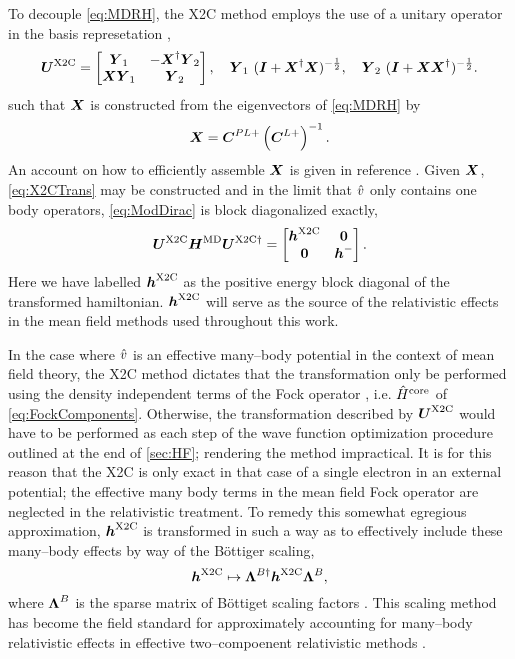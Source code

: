 To decouple \cref{eq:MDRH},
the X2C method employs the use of a unitary operator in the basis represetation ,
\begin{equation}
\label{eq:X2CTrans}
\boldsymbol{U}^{\mathrm{X2C}} = \begin{bmatrix} \boldsymbol{Y}_1 & - \boldsymbol{X}^\dagger \boldsymbol{Y}_2 \\ \boldsymbol{X} \boldsymbol{Y}_1 & \boldsymbol{Y}_2 \end{bmatrix},
\quad \boldsymbol{Y}_1 \ (\boldsymbol{I} + \boldsymbol{X}^\dagger \boldsymbol{X})^{-\frac{1}{2}},  
\quad \boldsymbol{Y}_2 \ (\boldsymbol{I} + \boldsymbol{X} \boldsymbol{X}^\dagger)^{-\frac{1}{2}}.  
\end{equation}
such that $\boldsymbol{X}$ is constructed from the eigenvectors of \cref{eq:MDRH} by
\begin{equation}
\boldsymbol{X} = \boldsymbol{C}^{PL+} \left(\boldsymbol{C}^{L+}\right)^{-1}.
\end{equation}
An account on how to efficiently assemble $\boldsymbol{X}$ is given in reference .
Given $\boldsymbol{X}$, \cref{eq:X2CTrans} may 
be constructed and in the limit that $\hat{v}$ only contains one body operators, \cref{eq:ModDirac} is block diagonalized 
exactly,
\begin{equation}
\boldsymbol{U}^{\mathrm{X2C}} \boldsymbol{H}^\mathrm{MD} \boldsymbol{U}^{\mathrm{X2C}\dagger} = \begin{bmatrix} \boldsymbol{h}^{\mathrm{X2C}} & \boldsymbol{0} \\ \boldsymbol{0} & \boldsymbol{h}^- \end{bmatrix}.
\end{equation}
Here we have labelled $\boldsymbol{h}^{\mathrm{X2C}}$ as the positive energy block diagonal of the transformed hamiltonian. $\boldsymbol{h}^{\mathrm{X2C}}$ 
will serve as the source of the relativistic effects in the mean field methods used throughout this work.

In the case where $\hat{v}$ is an effective many--body potential in the context of mean field theory, the X2C method
dictates that the transformation only be performed using the density independent terms of the Fock operator ,
i.e. $\hat{H}^\mathrm{core}$ of \cref{eq:FockComponents}. Otherwise, the transformation described by $\boldsymbol{U}^{\mathrm{X2C}}$ would
have to be performed as each step of the wave function optimization procedure outlined at the end  of \cref{sec:HF};
rendering the method impractical. It is for this reason that the X2C is only exact in that case of a single electron
in an external potential; the effective many body terms in the mean field Fock operator are neglected in the 
relativistic treatment. To remedy this somewhat egregious approximation, $\boldsymbol{h}^{\mathrm{X2C}}$ is transformed in such a
way as to effectively include these many--body effects by way of the B\"{o}ttiger  scaling,
\begin{equation}
\boldsymbol{h}^{\mathrm{X2C}} \mapsto \boldsymbol{\Lambda}^{B\dagger} \boldsymbol{h}^{\mathrm{X2C}} \boldsymbol{\Lambda}^{B},
\end{equation}
where $\boldsymbol{\Lambda}^B$ is the sparse matrix of B\"{o}ttiget scaling factors . This scaling method
has become the field standard for approximately accounting for many--body relativistic effects in effective
two--compoenent relativistic methods .








